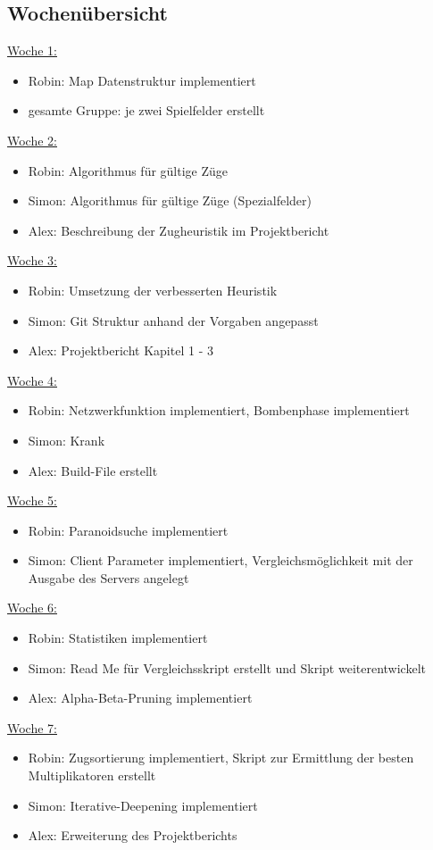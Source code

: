 \documentclass[12pt,a4paper,bibliography=totocnumbered,listof=totocnumbered]{article}
\begin{document}
\subsection{Wochenübersicht}
\underline{Woche 1:}
\begin{itemize}
\item Robin: Map Datenstruktur implementiert
\item gesamte Gruppe: je zwei Spielfelder erstellt
\end{itemize}
\underline{Woche 2:}
\begin{itemize}
\item Robin: Algorithmus für gültige Züge
\item Simon: Algorithmus für gültige Züge (Spezialfelder)
\item Alex: Beschreibung der Zugheuristik im Projektbericht
\end{itemize}
\underline{Woche 3:}
\begin{itemize}
\item Robin: Umsetzung der verbesserten Heuristik
\item Simon: Git Struktur anhand der Vorgaben angepasst
\item Alex: Projektbericht Kapitel 1 - 3
\end{itemize}
\underline{Woche 4:}
\begin{itemize}
\item Robin: Netzwerkfunktion implementiert, Bombenphase implementiert
\item Simon: Krank
\item Alex: Build-File erstellt
\end{itemize}
\underline{Woche 5:}
\begin{itemize}
\item Robin: Paranoidsuche implementiert
\item Simon: Client Parameter implementiert, Vergleichsmöglichkeit mit der Ausgabe des Servers angelegt
\end{itemize}
\underline{Woche 6:}
\begin{itemize}
\item Robin: Statistiken implementiert
\item Simon: Read Me für Vergleichsskript erstellt und Skript weiterentwickelt
\item Alex: Alpha-Beta-Pruning implementiert
\end{itemize}
\underline{Woche 7:}
\begin{itemize}
\item Robin: Zugsortierung implementiert, Skript zur Ermittlung der besten Multiplikatoren erstellt
\item Simon: Iterative-Deepening implementiert
\item Alex: Erweiterung des Projektberichts
\end{itemize}
\end{document}
